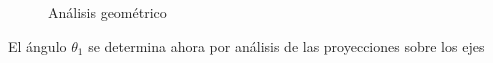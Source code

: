 \documentclass[a4paper,12pt]{article}
\begin{document}
\begin{figure}[htbp]
    \centering
    \begin{adjustbox}{scale = 0.55, max width=\columnwidth}
    \end{adjustbox}
    \caption{Análisis geométrico}
    \label{geometria 1}
\end{figure}

El ángulo $\theta_1$ se determina ahora por análisis de las proyecciones sobre los ejes
\end{document}
